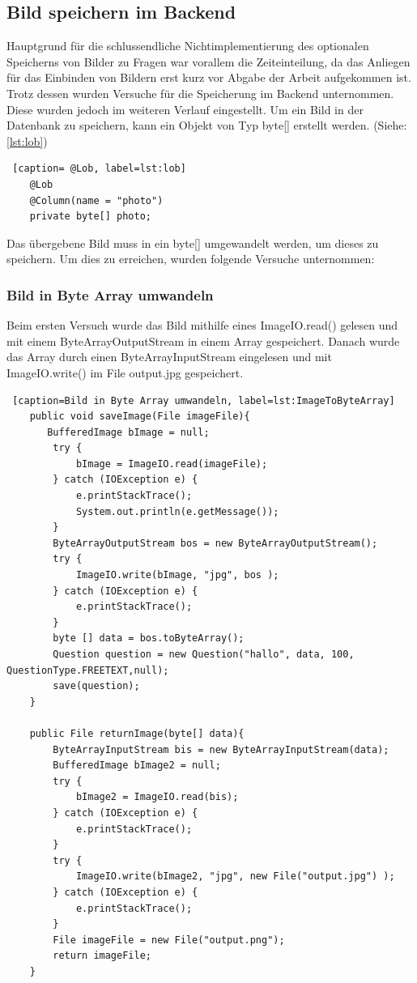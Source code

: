\subsection{Bild speichern im Backend}
Hauptgrund für die schlussendliche Nichtimplementierung des optionalen Speicherns von Bilder zu Fragen war vorallem
die Zeiteinteilung, da das Anliegen für das Einbinden von Bildern erst kurz vor Abgabe der Arbeit aufgekommen ist.
Trotz dessen wurden Versuche für die Speicherung im Backend unternommen. Diese wurden jedoch im weiteren Verlauf
eingestellt.
\newline
\newline
Um ein Bild in der Datenbank zu speichern, kann ein Objekt von Typ byte[] erstellt werden. (Siehe: \ref{lst:lob})
\begin{lstlisting} [caption= @Lob, label=lst:lob]
    @Lob
    @Column(name = "photo")
    private byte[] photo;
\end{lstlisting}
Das übergebene Bild muss in ein byte[] umgewandelt werden, um dieses zu speichern.
Um dies zu erreichen, wurden folgende Versuche unternommen:

\subsubsection{Bild in Byte Array umwandeln}
Beim ersten Versuch wurde das Bild mithilfe eines ImageIO.read() gelesen und mit einem ByteArrayOutputStream
in einem Array gespeichert. Danach wurde das Array durch einen ByteArrayInputStream eingelesen und mit
ImageIO.write() im File output.jpg gespeichert.

\begin{lstlisting} [caption=Bild in Byte Array umwandeln, label=lst:ImageToByteArray]
    public void saveImage(File imageFile){
       BufferedImage bImage = null;
        try {
            bImage = ImageIO.read(imageFile);
        } catch (IOException e) {
            e.printStackTrace();
            System.out.println(e.getMessage());
        }
        ByteArrayOutputStream bos = new ByteArrayOutputStream();
        try {
            ImageIO.write(bImage, "jpg", bos );
        } catch (IOException e) {
            e.printStackTrace();
        }
        byte [] data = bos.toByteArray();
        Question question = new Question("hallo", data, 100, QuestionType.FREETEXT,null);
        save(question);
    }

    public File returnImage(byte[] data){
        ByteArrayInputStream bis = new ByteArrayInputStream(data);
        BufferedImage bImage2 = null;
        try {
            bImage2 = ImageIO.read(bis);
        } catch (IOException e) {
            e.printStackTrace();
        }
        try {
            ImageIO.write(bImage2, "jpg", new File("output.jpg") );
        } catch (IOException e) {
            e.printStackTrace();
        }
        File imageFile = new File("output.png");
        return imageFile;
    }
\end{lstlisting}

